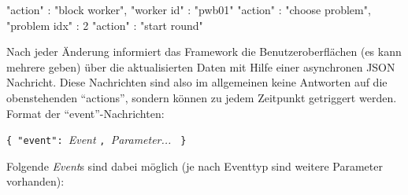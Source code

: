 \documentclass[a4paper, 12pt]{article}
\newenvironment{example}[1]{%
  \par\description[\setlabelstyle{\normalfont}\setlabelphantom{#1}]\item[#1]%
    \verbatim%
}{%
    \endverbatim%
  \enddescription%
}
\begin{document}
\begin{example}{Beispiele:}
{ "action" : "block worker", "worker id" : "pwb01" }
{ "action" : "choose problem", "problem idx" : 2 }
{ "action" : "start round" }
\end{example}

Nach jeder Änderung informiert das Framework die Benutzeroberflächen (es kann
mehrere geben) über die aktualisierten Daten mit Hilfe einer asynchronen JSON
Nachricht. Diese Nachrichten sind also im allgemeinen keine Antworten auf
die obenstehenden ``actions'', sondern können zu jedem Zeitpunkt getriggert
werden. Format der ``event''-Nachrichten:

\begin{description}
  \item\texttt{\{ "{}event": }\textit{Event}%
       \texttt{,\ }\textit{Parameter...}%
       \texttt{ \}}
\end{description}

Folgende \textit{Event}s sind dabei möglich (je nach Eventtyp sind weitere
Parameter vorhanden):
\end{document}
